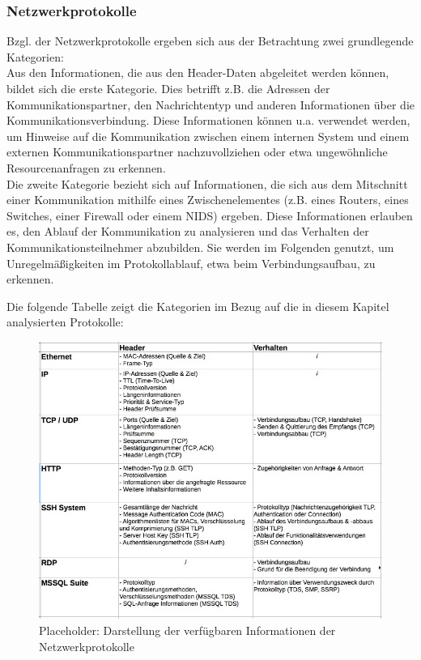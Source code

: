 \subsubsection{Netzwerkprotokolle} 
Bzgl. der Netzwerkprotokolle ergeben sich aus der Betrachtung zwei grundlegende Kategorien: \\

Aus den Informationen, die aus den Header-Daten abgeleitet werden können, bildet sich die erste Kategorie. Dies betrifft z.B. die Adressen der Kommunikationspartner, den Nachrichtentyp und anderen Informationen über die Kommunikationsverbindung. Diese Informationen können u.a. verwendet werden, um Hinweise auf die Kommunikation zwischen einem internen System und einem externen Kommunikationspartner nachzuvollziehen oder etwa ungewöhnliche Resourcenanfragen zu erkennen. \\

Die zweite Kategorie bezieht sich auf Informationen, die sich aus dem Mitschnitt einer Kommunikation mithilfe eines Zwischenelementes (z.B. eines Routers, eines Switches, einer Firewall oder einem NIDS) ergeben. Diese Informationen erlauben es, den Ablauf der Kommunikation zu analysieren und das Verhalten der Kommunikationsteilnehmer abzubilden. Sie werden im Folgenden genutzt, um Unregelmäßigkeiten im Protokollablauf, etwa beim Verbindungsaufbau, zu erkennen.

Die folgende Tabelle zeigt die Kategorien im Bezug auf die in diesem Kapitel analysierten Protokolle:

\begin{figure}[h]
\centering
\includegraphics[width=125mm]{Zeichnungen/UnternehmensnetzwerkInformationen.jpg}
\caption{Placeholder: Darstellung der verfügbaren Informationen der Netzwerkprotokolle}
\label{fig:EnterpriseNetworkInformation}
\end{figure}


